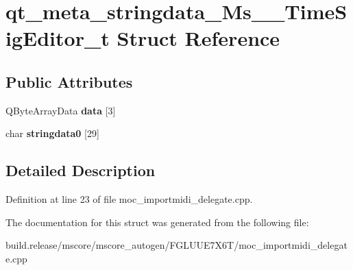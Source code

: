 \hypertarget{structqt__meta__stringdata___ms_____time_sig_editor__t}{}\section{qt\+\_\+meta\+\_\+stringdata\+\_\+\+Ms\+\_\+\+\_\+\+Time\+Sig\+Editor\+\_\+t Struct Reference}
\label{structqt__meta__stringdata___ms_____time_sig_editor__t}
\subsection*{Public Attributes}
\begin{DoxyCompactItemize}
\item 
\mbox{\label{structqt__meta__stringdata___ms_____time_sig_editor__t_a6b80bfc7e08b2b1209ae7de787f3ebfd}} 
Q\+Byte\+Array\+Data {\bfseries data} \mbox{[}3\mbox{]}
\item 
\mbox{\label{structqt__meta__stringdata___ms_____time_sig_editor__t_ad4fc31f1017d2fc8b94bd5f6e91fb7be}} 
char {\bfseries stringdata0} \mbox{[}29\mbox{]}
\end{DoxyCompactItemize}


\subsection{Detailed Description}


Definition at line 23 of file moc\+\_\+importmidi\+\_\+delegate.\+cpp.



The documentation for this struct was generated from the following file\+:\begin{DoxyCompactItemize}
\item 
build.\+release/mscore/mscore\+\_\+autogen/\+F\+G\+L\+U\+U\+E7\+X6\+T/moc\+\_\+importmidi\+\_\+delegate.\+cpp\end{DoxyCompactItemize}
